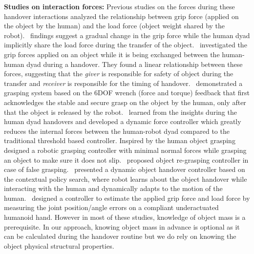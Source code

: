 \textbf{Studies on interaction forces:} Previous studies on the forces during these handover interactions analyzed the relationship between grip force (applied on the object by the human) and the load force (object weight shared by the robot).~\cite{mason2005grip} findings suggest a gradual change in the grip force while the human dyad implicitly share the load force during the transfer of the object.~\cite{chan2013human} investigated the grip forces applied on an object while it is being exchanged between the human-human dyad during a handover. They found a linear relationship between these forces, suggesting that the \textit{giver} is responsible for safety of object during the transfer and \textit{receiver} is responsible for the timing of handover.~\cite{nagata1998delivery} demonstrated a grasping system based on the 6DOF wrench (force and torque) feedback that first acknowledges the stable and secure grasp on the object by the human, only after that the object is released by the robot.~\cite{medina2016human} learned from the insights during the human dyad handovers and developed a dynamic force controller which greatly reduces the internal forces between the human-robot dyad compared to the traditional threshold based controller. Inspired by the human object grasping~\cite{sadigh2009safe} designed a robotic grasping controller with minimal normal forces while grasping an object to make sure it does not slip.~\cite{parastegari2018failure} proposed object re-grasping controller in case of false grasping.~\cite{kupcsik2016learning} presented a dynamic object handover controller based on the contextual policy search, where robot learns about the object handover while interacting with the human and dynamically adapts to the motion of the human.~\cite{chan2014implementation} designed a controller to estimate the applied grip force and load force by measuring the joint position/angle errors on a compliant underactuated humanoid hand. However in most of these studies, knowledge of object mass is a prerequisite. In our approach, knowing object mass in advance is optional as it can be calculated during the handover routine but we do rely on knowing the object physical structural properties. 

